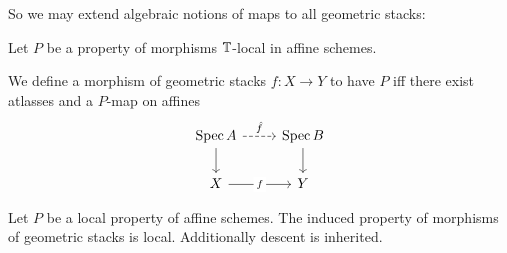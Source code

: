 So we may extend algebraic notions of maps to all geometric stacks:
\begin{definition}
	Let $P$ be a property of morphisms $\mathbb{T}$-local in affine schemes.
	
	We define a morphism of geometric stacks $f : X \to Y$ to have $P$ iff
	there exist atlasses and a $P$-map on affines 
	\[\begin{tikzcd}
		{\Spec A} & {\Spec B} \\
		X & Y
		\arrow["{\hat f}", dashed, from=1-1, to=1-2]
		\arrow[from=1-1, to=2-1]
		\arrow[from=1-2, to=2-2]
		\arrow["f"{description}, from=2-1, to=2-2]
	\end{tikzcd}\]	
\end{definition}
\begin{lemma}
	Let $P$  be a local property of affine schemes. The induced property of morphisms of geometric stacks is local. Additionally descent is inherited.
\end{lemma}
